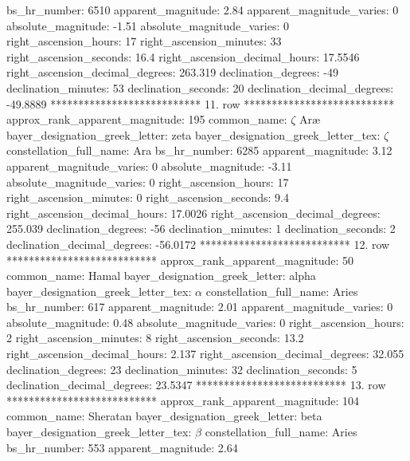                       bs_hr_number: 6510
                apparent_magnitude: 2.84
         apparent_magnitude_varies: 0
                absolute_magnitude: -1.51
         absolute_magnitude_varies: 0
             right_ascension_hours: 17
           right_ascension_minutes: 33
           right_ascension_seconds: 16.4
     right_ascension_decimal_hours: 17.5546
   right_ascension_decimal_degrees: 263.319
               declination_degrees: -49
               declination_minutes: 53
               declination_seconds: 20
       declination_decimal_degrees: -49.8889
*************************** 11. row ***************************
    approx_rank_apparent_magnitude: 195
                       common_name: $\zeta$ Ar{\ae}
    bayer_designation_greek_letter: zeta
bayer_designation_greek_letter_tex: $\zeta$
           constellation_full_name: Ara
                      bs_hr_number: 6285
                apparent_magnitude: 3.12
         apparent_magnitude_varies: 0
                absolute_magnitude: -3.11
         absolute_magnitude_varies: 0
             right_ascension_hours: 17
           right_ascension_minutes: 0
           right_ascension_seconds: 9.4
     right_ascension_decimal_hours: 17.0026
   right_ascension_decimal_degrees: 255.039
               declination_degrees: -56
               declination_minutes: 1
               declination_seconds: 2
       declination_decimal_degrees: -56.0172
*************************** 12. row ***************************
    approx_rank_apparent_magnitude: 50
                       common_name: Hamal
    bayer_designation_greek_letter: alpha
bayer_designation_greek_letter_tex: $\alpha$
           constellation_full_name: Aries
                      bs_hr_number: 617
                apparent_magnitude: 2.01
         apparent_magnitude_varies: 0
                absolute_magnitude: 0.48
         absolute_magnitude_varies: 0
             right_ascension_hours: 2
           right_ascension_minutes: 8
           right_ascension_seconds: 13.2
     right_ascension_decimal_hours: 2.137
   right_ascension_decimal_degrees: 32.055
               declination_degrees: 23
               declination_minutes: 32
               declination_seconds: 5
       declination_decimal_degrees: 23.5347
*************************** 13. row ***************************
    approx_rank_apparent_magnitude: 104
                       common_name: Sheratan
    bayer_designation_greek_letter: beta
bayer_designation_greek_letter_tex: $\beta$
           constellation_full_name: Aries
                      bs_hr_number: 553
                apparent_magnitude: 2.64
